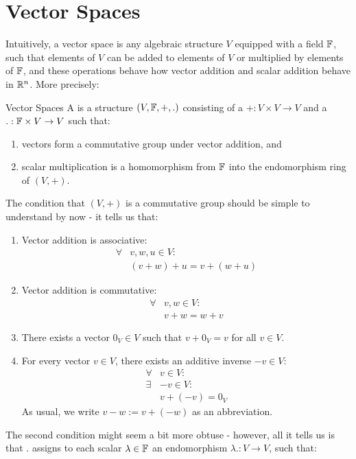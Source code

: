 \section{Vector Spaces}
Intuitively, a vector space is any algebraic structure $V$ equipped with a field $\mathbb{F}$, such that elements of $V$ can be added to elements of $V$ or multiplied by elements of $\mathbb{F}$, and these operations behave how vector addition and scalar addition behave in $\mathbb{R}^n$. More precisely:
\begin{importantdefinition}{Vector Spaces}{}
	A  is a structure $(V,\mathbb{F},+,.)$ consisting of a  $+ : V \times V \to V$ and a  $. : \mathbb{F} \times V \to V$ such that:
	\begin{enumerate}
		\item vectors form a commutative group under vector addition, and
		\item scalar multiplication is a homomorphism from $\mathbb{F}$ into the endomorphism ring of $(V,+)$.
	\end{enumerate}
\end{importantdefinition}
The condition that $(V,+)$ is a commutative group should be simple to understand by now - it tells us that:
\begin{enumerate}
	\item Vector addition is associative:
	\begin{align*}
		\forall &v,w,u \in V:\\
		&(v + w) + u = v + (w + u)
	\end{align*}
	\item Vector addition is commutative:
	\begin{align*}
		\forall &v,w \in V:\\
		&v + w = w + v
	\end{align*}
	\item There exists a vector $0_V \in V$ such that $v + 0_V = v$ for all $v \in V$.
	\item For every vector $v \in V$, there exists an additive inverse $-v \in V$:
	\begin{align*}
		\forall &v \in V:\\
		\exists &-v \in V:\\
		&v + (-v) = 0_V
	\end{align*} 
	As usual, we write $v - w := v + (-w)$ as an abbreviation.
\end{enumerate}
The second condition might seem a bit more obtuse - however, all it tells us is that $.$ assigns to each scalar $\lambda \in \mathbb{F}$ an endomorphism $\lambda. : V \to V$, such that:
